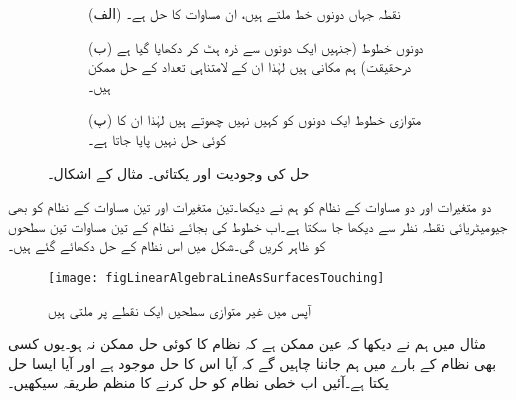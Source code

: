 \begin{figure}
\centering
\begin{subfigure}{0.5\textwidth}
\centering
{}
\caption*{(الف) نقطہ  جہاں دونوں خط ملتے ہیں، ان مساوات کا حل ہے۔}
\end{subfigure}%
\begin{subfigure}{0.5\textwidth}
\centering
{}
\caption*{(ب) دونوں خطوط (جنہیں ایک دونوں سے ذرہ ہٹ کر دکھایا گیا ہے درحقیقت) ہم مکانی ہیں لہٰذا ان کے لامتناہی تعداد کے حل ممکن ہیں۔}
\end{subfigure}
\begin{subfigure}{0.5\textwidth}
\centering
{}
\caption*{(پ) متوازی خطوط ایک دونوں کو کہیں نہیں چھوتے ہیں لہٰذا ان کا کوئی حل نہیں پایا جاتا ہے۔}
\end{subfigure}%
\caption{حل کی وجودیت اور یکتائی۔ مثال  کے اشکال۔}
\label{شکل_مثال_الجبرا_وجودیت_یکتائی_حل_الف}
\end{figure}
دو متغیرات اور دو مساوات کے نظام کو ہم نے دیکھا۔تین متغیرات اور تین مساوات کے نظام  کو بھی جیومیٹریائی نقطہ نظر سے دیکھا جا سکتا ہے۔اب خطوط کی بجائے نظام کے تین مساوات تین سطحوں کو ظاہر کریں گی۔شکل  میں اس نظام کے حل دکھائے گئے ہیں۔
\begin{figure}
\centering
\texttt{[image: figLinearAlgebraLineAsSurfacesTouching]}
\caption{آپس میں غیر متوازی سطحیں ایک نقطے پر ملتی ہیں}
\label{شکل_خطی_الجبرا_سطح_نقطے_پر_ملتی_ہیں}
\end{figure}
مثال  میں ہم نے دیکھا کہ عین ممکن ہے کہ نظام کا کوئی حل ممکن نہ ہو۔یوں کسی بھی نظام کے بارے میں ہم جاننا چاہیں گے کہ آیا اس کا حل موجود ہے اور آیا ایسا حل یکتا ہے۔آئیں اب خطی نظام کو حل کرنے کا منظم طریقہ سیکھیں۔

